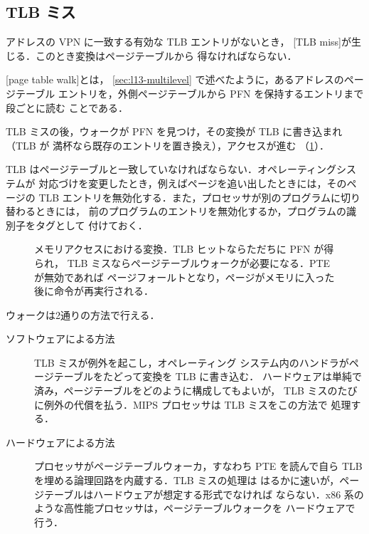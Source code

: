 \documentclass[../main.tex]{subfiles}
\begin{document}
\subsection{TLB ミス}

アドレスの VPN に一致する有効な TLB エントリがないとき，
[TLB miss]が生じる．このとき変換はページテーブルから
得なければならない．

\begin{definition}[ページテーブルウォーク]
  [page table walk]とは，
  \cref{sec:l13-multilevel} で述べたように，あるアドレスのページテーブル
  エントリを，外側ページテーブルから PFN を保持するエントリまで段ごとに読む
  ことである．
\end{definition}

TLB ミスの後，ウォークが PFN を見つけ，その変換が TLB に書き込まれ（TLB が
満杯なら既存のエントリを置き換え），アクセスが進む
（\cref{fig:l13-tlb-flow}）．

TLB はページテーブルと一致していなければならない．オペレーティングシステムが
対応づけを変更したとき，例えばページを追い出したときには，そのページの TLB
エントリを無効化する．また，プロセッサが別のプログラムに切り替わるときには，
前のプログラムのエントリを無効化するか，プログラムの識別子をタグとして
付けておく．

\begin{figure}[htbp]
  \centering
  
  \caption{メモリアクセスにおける変換．TLB ヒットならただちに PFN が得られ，
    TLB ミスならページテーブルウォークが必要になる．PTE が無効であれば
    ページフォールトとなり，ページがメモリに入った後に命令が再実行される．}
  \label{fig:l13-tlb-flow}
\end{figure}

ウォークは2通りの方法で行える．
\begin{description}
  \item[ソフトウェアによる方法] TLB ミスが例外を起こし，オペレーティング
    システム内のハンドラがページテーブルをたどって変換を TLB に書き込む．
    ハードウェアは単純で済み，ページテーブルをどのように構成してもよいが，
    TLB ミスのたびに例外の代償を払う．MIPS プロセッサは TLB ミスをこの方法で
    処理する．
  \item[ハードウェアによる方法] プロセッサがページテーブルウォーカ，すなわち
    PTE を読んで自ら TLB を埋める論理回路を内蔵する．TLB ミスの処理は
    はるかに速いが，ページテーブルはハードウェアが想定する形式でなければ
    ならない．x86 系のような高性能プロセッサは，ページテーブルウォークを
    ハードウェアで行う．
\end{description}
\end{document}
